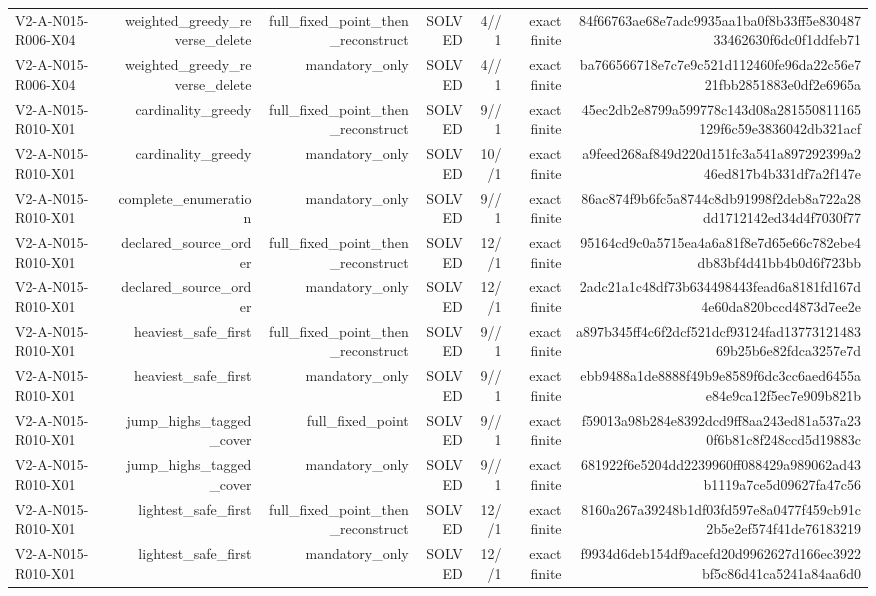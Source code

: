 {\begin{longtable}{lrrrrrr}
V2-A-N015-R006-X04 & weighted\_greedy\_reverse\_delete & full\_fixed\_point\_then\_reconstruct & SOLVED & 4//1 & exact finite & 84f66763ae68e7adc9935aa1ba0f8b33ff5e83048733462630f6dc0f1ddfeb71 \\
V2-A-N015-R006-X04 & weighted\_greedy\_reverse\_delete & mandatory\_only & SOLVED & 4//1 & exact finite & ba766566718e7c7e9c521d112460fe96da22c56e721fbb2851883e0df2e6965a \\
V2-A-N015-R010-X01 & cardinality\_greedy & full\_fixed\_point\_then\_reconstruct & SOLVED & 9//1 & exact finite & 45ec2db2e8799a599778c143d08a281550811165129f6c59e3836042db321acf \\
V2-A-N015-R010-X01 & cardinality\_greedy & mandatory\_only & SOLVED & 10//1 & exact finite & a9feed268af849d220d151fc3a541a897292399a246ed817b4b331df7a2f147e \\
V2-A-N015-R010-X01 & complete\_enumeration & mandatory\_only & SOLVED & 9//1 & exact finite & 86ac874f9b6fc5a8744c8db91998f2deb8a722a28dd1712142ed34d4f7030f77 \\
V2-A-N015-R010-X01 & declared\_source\_order & full\_fixed\_point\_then\_reconstruct & SOLVED & 12//1 & exact finite & 95164cd9c0a5715ea4a6a81f8e7d65e66c782ebe4db83bf4d41bb4b0d6f723bb \\
V2-A-N015-R010-X01 & declared\_source\_order & mandatory\_only & SOLVED & 12//1 & exact finite & 2adc21a1c48df73b634498443fead6a8181fd167d4e60da820bccd4873d7ee2e \\
V2-A-N015-R010-X01 & heaviest\_safe\_first & full\_fixed\_point\_then\_reconstruct & SOLVED & 9//1 & exact finite & a897b345ff4c6f2dcf521dcf93124fad1377312148369b25b6e82fdca3257e7d \\
V2-A-N015-R010-X01 & heaviest\_safe\_first & mandatory\_only & SOLVED & 9//1 & exact finite & ebb9488a1de8888f49b9e8589f6dc3cc6aed6455ae84e9ca12f5ec7e909b821b \\
V2-A-N015-R010-X01 & jump\_highs\_tagged\_cover & full\_fixed\_point & SOLVED & 9//1 & exact finite & f59013a98b284e8392dcd9ff8aa243ed81a537a230f6b81c8f248ccd5d19883c \\
V2-A-N015-R010-X01 & jump\_highs\_tagged\_cover & mandatory\_only & SOLVED & 9//1 & exact finite & 681922f6e5204dd2239960ff088429a989062ad43b1119a7ce5d09627fa47c56 \\
V2-A-N015-R010-X01 & lightest\_safe\_first & full\_fixed\_point\_then\_reconstruct & SOLVED & 12//1 & exact finite & 8160a267a39248b1df03fd597e8a0477f459cb91c2b5e2ef574f41de76183219 \\
V2-A-N015-R010-X01 & lightest\_safe\_first & mandatory\_only & SOLVED & 12//1 & exact finite & f9934d6deb154df9acefd20d9962627d166ec3922bf5c86d41ca5241a84aa6d0 \\

\end{longtable}}
